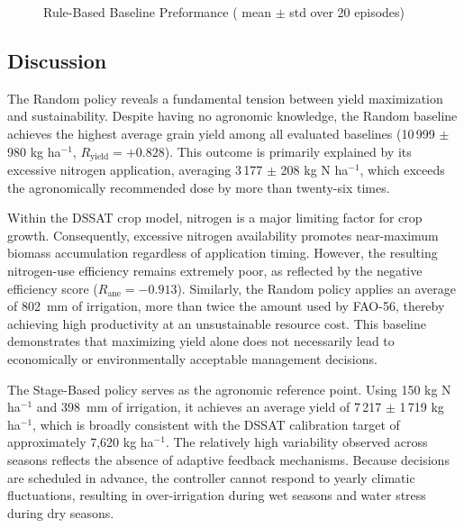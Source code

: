 
\begin{figure}[ht]
\centering
\caption{Rule-Based Baseline Preformance ( mean $\pm$ std over 20 episodes)}
\label{fig:baseline_performance}
\end{figure}


\subsection{Discussion}

The Random policy reveals a fundamental tension between yield maximization and sustainability. Despite having no agronomic knowledge, the Random baseline achieves the highest average grain yield among all evaluated baselines (10\,999 $\pm$ 980 kg ha$^{-1}$, $R_{\text{yield}} = +0.828$). This outcome is primarily explained by its excessive nitrogen application, averaging 3\,177 $\pm$ 208 kg N ha$^{-1}$, which exceeds the agronomically recommended dose by more than twenty-six times.

Within the DSSAT crop model, nitrogen is a major limiting factor for crop growth. Consequently, excessive nitrogen availability promotes near-maximum biomass accumulation regardless of application timing. However, the resulting nitrogen-use efficiency remains extremely poor, as reflected by the negative efficiency score ($R_{\text{ane}} = -0.913$). Similarly, the Random policy applies an average of 802~mm of irrigation, more than twice the amount used by FAO-56, thereby achieving high productivity at an unsustainable resource cost. This baseline demonstrates that maximizing yield alone does not necessarily lead to economically or environmentally acceptable management decisions.

The Stage-Based policy serves as the agronomic reference point. Using 150 kg N ha$^{-1}$ and 398~mm of irrigation, it achieves an average yield of 7\,217 $\pm$ 1\,719 kg ha$^{-1}$, which is broadly consistent with the DSSAT calibration target of approximately 7,620 kg ha$^{-1}$. The relatively high variability observed across seasons reflects the absence of adaptive feedback mechanisms. Because decisions are scheduled in advance, the controller cannot respond to yearly climatic fluctuations, resulting in over-irrigation during wet seasons and water stress during dry seasons.

